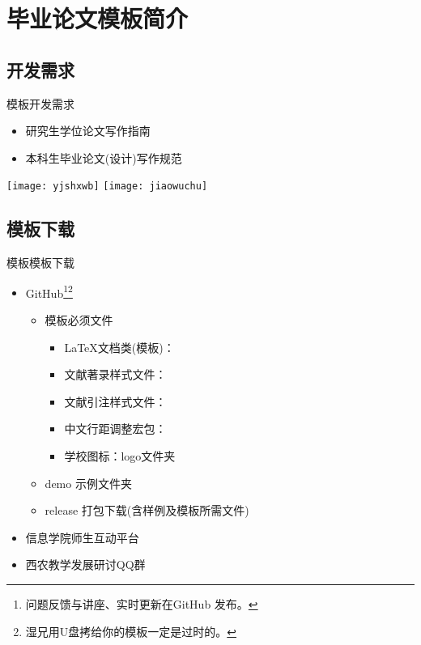 \documentclass[fontset = adobe, xcolor=svgnames, t, aspectratio=169]{ctexbeamer}
\begin{document}
\section[\nwafuthesis]{\nwafuthesis 毕业论文模板简介}
\subsection[开发需求]{开发需求}
\begin{frame}[t]{\nwafuthesis 模板}{开发需求}
  \stretchon
  \begin{itemize}
  \item {研究生学位论文写作指南}
  \item {本科生毕业论文(设计)写作规范}
  \end{itemize}
  \centering
  \texttt{[image: yjshxwb]}\quad
  \texttt{[image: jiaowuchu]}
  \stretchoff
\end{frame}

\subsection[模板下载]{模板下载}
\begin{frame}[t]{\nwafuthesis 模板}{模板下载}
  \stretchon
  \begin{itemize}
  \item \faGithub GitHub\footnote[frame, 1]{问题反馈与讲座、实时更新在GitHub
      发布。}\footnote[frame, 2]{湿兄用U盘拷给你的模板一定是过时的。}
    \begin{itemize}
    \item 模板必须文件
      \begin{itemize}
      \item \LaTeX 文档类(模板)： 
      \item 文献著录样式文件：
      \item 文献引注样式文件：
      \item 中文行距调整宏包：
      \item 学校图标：logo文件夹
      \end{itemize}
    \item demo 示例文件夹
    \item release 打包下载(含样例及模板所需文件)
    \end{itemize}
  \item {信息学院师生互动平台}
  \item 西农教学发展研讨QQ群
  \end{itemize}
  \stretchoff
\end{frame}
\end{document}
